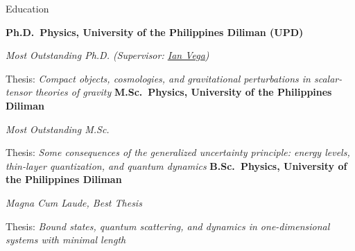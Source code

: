 \begin{rubric}{Education}

%
	\textbf{Ph.D.~Physics, University of the Philippines Diliman (UPD)}\par
        \small\emph{Most Outstanding Ph.D. (Supervisor: \href{https://gravity-nip.github.io/}{Ian Vega})}\par
	Thesis: \small\emph{Compact objects, cosmologies, and gravitational perturbations in scalar-tensor theories of gravity}
%
%
	\textbf{M.Sc.~Physics, University of the Philippines Diliman}\par
        \small\emph{Most Outstanding M.Sc.}\par
	Thesis: \small\emph{Some consequences of the generalized uncertainty principle: energy levels, thin-layer quantization, and quantum dynamics}
%
%
	\textbf{B.Sc.~Physics, University of the Philippines Diliman}\par
        \small\emph{Magna Cum Laude, Best Thesis}\par
	Thesis: \small\emph{Bound states, quantum scattering, and dynamics in one-dimensional systems with minimal length}
\end{rubric}
